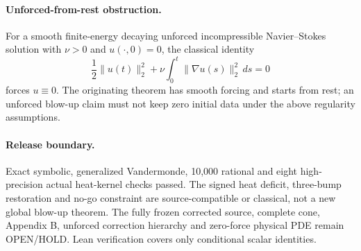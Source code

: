\paragraph{Unforced-from-rest obstruction.}
For a smooth finite-energy decaying unforced incompressible
Navier--Stokes solution with $\nu>0$ and $u(\cdot,0)=0$,
the classical identity
\[
\frac12\|u(t)\|_2^2+
\nu\int_0^t\|\nabla u(s)\|_2^2\,ds=0
\]
forces $u\equiv0$. The originating theorem has smooth forcing
and starts from rest; an unforced blow-up claim must not keep
zero initial data under the above regularity assumptions.
\paragraph{Release boundary.}
Exact symbolic, generalized Vandermonde, 10,000 rational and
eight high-precision actual heat-kernel checks passed.
The signed heat deficit, three-bump restoration and no-go
constraint are source-compatible or classical, not a new
global blow-up theorem. The fully frozen corrected source,
complete cone, Appendix B, unforced correction hierarchy
and zero-force physical PDE remain OPEN/HOLD.
Lean verification covers only conditional scalar identities.